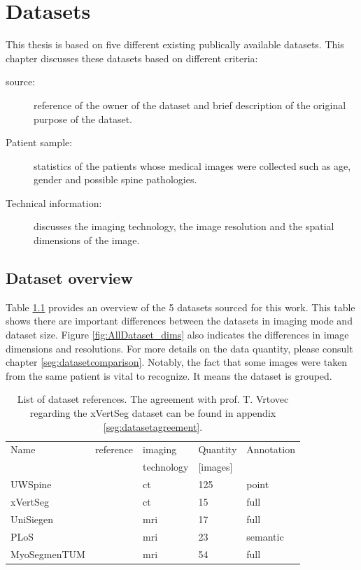 \chapter{Datasets\label{sec:datasets}}\thispagestyle{empty}

This thesis is based on five different existing publically available datasets.
This chapter discusses these datasets based on different criteria:

\begin{description}
    \item[source:] reference of the owner of the dataset and brief description of the original purpose of the dataset.
    \item[Patient sample:] statistics of the patients whose medical images were collected such as age, gender and possible spine pathologies.
    \item[Technical information:] discusses the imaging technology, the image resolution and the spatial dimensions of the image. 
\end{description}

\section{Dataset overview}

Table \ref{tab:datasetReferences} provides an overview of the 5 datasets sourced for this work.
This table shows there are important differences between the datasets in imaging mode and dataset size.
Figure \ref{fig:AllDataset_dims} also indicates the differences in image dimensions and resolutions.
For more details on the data quantity, please consult chapter \ref{seg:datasetcomparison}. 
Notably, the fact that some images were taken from the same patient is vital to recognize. It means the dataset is grouped. 


\begin{table}
 
    \begin{tabular}{ l l l l l} 
     \toprule
     Name & reference & imaging & Quantity & Annotation \\
          &           & technology & [images] & \\
     \hline 
    UWSpine & \cite{Glocker}  & \acrshort{ct} & 125 & point  \\ 
    xVertSeg & \cite{Ibragimov2014, Korez2015} & \acrshort{ct} & 15 & full \\
    UniSiegen  & \cite{Zukic2014} & \acrshort{mri} & 17 & full \\
    PLoS & \cite{Chu2015} & \acrshort{mri} & 23 & semantic \\
    MyoSegmenTUM & \cite{Burian2019} & \acrshort{mri} &  54 & full \\
     \bottomrule
    \end{tabular}
    \caption{List of dataset references. 
    The agreement with prof. T. Vrtovec regarding the xVertSeg dataset can be found in appendix \ref{seg:datasetagreement}.\label{tab:datasetReferences}}

\end{table}

